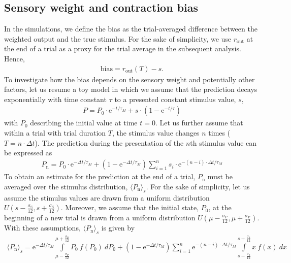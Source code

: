 \documentclass[10pt,a4paper,draft]{article}
\begin{document}
\subsection{Sensory weight and contraction bias}
%
In the simulations, we define the bias as the trial-averaged difference between the weighted output and the true stimulus. For the sake of simplicity, we use $r_\mathrm{out}$ at the end of a trial as a proxy for the trial average in the subsequent analysis. Hence, 
%
\begin{align}
 \mathrm{bias} = r_\mathrm{out}(T) - s.
\end{align}
%
To investigate how the bias depends on the sensory weight and potentially other factors, let us resume a toy model in which we assume that the prediction decays exponentially with time constant $\tau$ to a presented constant stimulus value, $s$,
%
\begin{align}
P = P_\mathrm{0} \cdot \mathrm{e}^{-t/\tau_M} +  s \cdot \left( 1 -   \mathrm{e}^{-t/\tau} \right)
\end{align}
%
with $P_0$ describing the initial value at time $t=0$. Let us further assume that within a trial with trial duration $T$, the stimulus value changes $n$ times ($T = n\cdot \Delta t$).  The prediction during the presentation of the $n$th stimulus value can be expressed as
%
\begin{align}
P_\mathrm{n} = P_\mathrm{0} \cdot \mathrm{e}^{-\Delta t/\tau_M}  + \left( 1 -   \mathrm{e}^{-\Delta t/\tau_M} \right) \sum_{i=1}^{n} s_i \cdot \mathrm{e}^{-(n-i)\cdot \Delta t/ \tau_M}
\end{align}
%
To obtain an estimate for the prediction at the end of a trial, $P_\mathrm{n}$ must be averaged over the stimulus distribution, $\langle P_\mathrm{n} \rangle_s$. For the sake of simplicity, let us assume the stimulus values are drawn from a uniform distribution $U\left( s - \frac{\sigma_\mathrm{S}}{12}, s + \frac{\sigma_\mathrm{S}}{12} \right)$. Moreover, we assume that the initial state, $P_0$, at the beginning of a new trial is drawn from a uniform distribution $U\left( \mu - \frac{\sigma_\mathrm{P}}{12}, \mu + \frac{\sigma_\mathrm{P}}{12} \right)$. With these assumptions, $\langle P_\mathrm{n} \rangle_s$ is given by
%
\begin{align}
\langle P_\mathrm{n} \rangle_s = \mathrm{e}^{-\Delta t/\tau_M}  \int\limits_{\mu - \frac{\sigma_\mathrm{P}}{12}}^{\mu + \frac{\sigma_\mathrm{P}}{12}} P_\mathrm{0} \ f(P_\mathrm{0})\ dP_0+ \left( 1 -   \mathrm{e}^{-\Delta t/\tau_M} \right) \sum_{i=1}^{n} \mathrm{e}^{-(n-i)\cdot \Delta t/ \tau_M} \int\limits_{s - \frac{\sigma_\mathrm{S}}{12}}^{s + \frac{\sigma_\mathrm{S}}{12}} x\ f(x)\ dx
\end{align}
\end{document}
